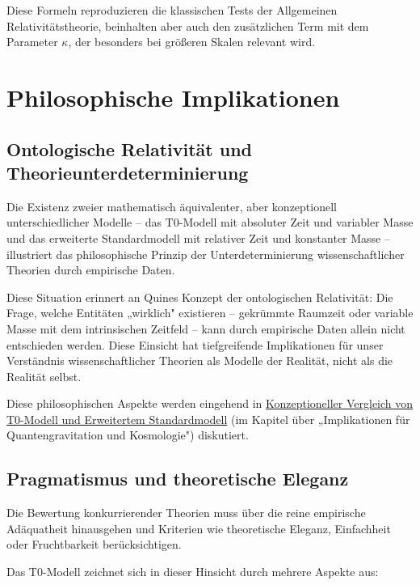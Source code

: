 \documentclass[12pt,a4paper]{article}
\begin{document}
	Diese Formeln reproduzieren die klassischen Tests der Allgemeinen Relativitätstheorie, beinhalten aber auch den zusätzlichen Term mit dem Parameter $\kappa$, der besonders bei größeren Skalen relevant wird.
	
	\section{Philosophische Implikationen}
	\label{sec:philosophical_implications}
	
	\subsection{Ontologische Relativität und Theorieunterdeterminierung}
	\label{subsec:ontological_relativity}
	
	Die Existenz zweier mathematisch äquivalenter, aber konzeptionell unterschiedlicher Modelle – das T0-Modell mit absoluter Zeit und variabler Masse und das erweiterte Standardmodell mit relativer Zeit und konstanter Masse – illustriert das philosophische Prinzip der Unterdeterminierung wissenschaftlicher Theorien durch empirische Daten.
	
	Diese Situation erinnert an Quines Konzept der ontologischen Relativität: Die Frage, welche Entitäten „wirklich" existieren – gekrümmte Raumzeit oder variable Masse mit dem intrinsischen Zeitfeld – kann durch empirische Daten allein nicht entschieden werden. Diese Einsicht hat tiefgreifende Implikationen für unser Verständnis wissenschaftlicher Theorien als Modelle der Realität, nicht als die Realität selbst.
	
	Diese philosophischen Aspekte werden eingehend in \href{https://github.com/jpascher/T0-Time-Mass-Duality/tree/main/2/pdf/English/T0vsESM_ConceptualAnalysisEn.pdf}{Konzeptioneller Vergleich von T0-Modell und Erweitertem Standardmodell} (im Kapitel über „Implikationen für Quantengravitation und Kosmologie") diskutiert.
	
	\subsection{Pragmatismus und theoretische Eleganz}
	\label{subsec:pragmatism_elegance}
	
	Die Bewertung konkurrierender Theorien muss über die reine empirische Adäquatheit hinausgehen und Kriterien wie theoretische Eleganz, Einfachheit oder Fruchtbarkeit berücksichtigen.
	
	Das T0-Modell zeichnet sich in dieser Hinsicht durch mehrere Aspekte aus:
	
\end{document}
